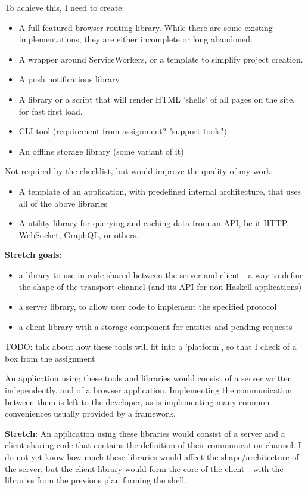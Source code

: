 \documentclass[english,odsaz]{fitthesis}
\begin{document}
To achieve this, I need to create:
\begin{itemize}
\item A full-featured browser routing library. While there are some existing
implementations, they are either incomplete or long abandoned.
\item A wrapper around ServiceWorkers, or a template to simplify project creation.
\item A push notifications library.
\item A library or a script that will render HTML 'shells' of all pages on the site,
for fast first load.
\item CLI tool (requirement from assignment? "support tools")
\item An offline storage library (some variant of it)
\end{itemize}

Not required by the checklist, but would improve the quality of my work:
\begin{itemize}
\item A template of an application, with predefined internal architecture, that uses
all of the above libraries
\item A utility library for querying and caching data from an API, be it HTTP, WebSocket,
GraphQL, or others.
\end{itemize}

\textbf{Stretch goals}:
\begin{itemize}
\item a library to use in code shared between the server and client - a way to
define the shape of the transport channel (and its API for non-Haskell
applications)
\item a server library, to allow user code to implement the specified protocol
\item a client library with a storage component for entities and pending requests
\end{itemize}

TODO: talk about how these tools will fit into a 'platform', so that I check of
a box from the assignment

An application using these tools and libraries would consist of a server written
independently, and of a browser application. Implementing the communication
between them is left to the developer, as is implementing many common
conveniences usually provided by a framework.

\textbf{Stretch}: An application using these libraries would consist of a server and a client
sharing code that contains the definition of their communication channel. I do
not yet know how much these libraries would affect the shape/architecture of the
server, but the client library would form the core of the client - with the
libraries from the previous plan forming the shell.
\end{document}
